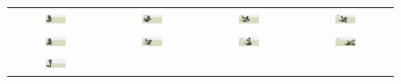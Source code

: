 \begin{figure}[ht]
\center
\setlength{\tabcolsep}{1pt}
\renewcommand{\arraystretch}{0.5}
\begin{tabular}{c c c c}
\includegraphics[width=0.24\textwidth]{images/GP_A_0.png}&
\includegraphics[width=0.24\textwidth]{images/GP_A_1.png}&
\includegraphics[width=0.24\textwidth]{images/GP_A_2.png}&
\includegraphics[width=0.24\textwidth]{images/GP_A_3.png} \\
\includegraphics[width=0.24\textwidth]{images/GP_B_0.png}&
\includegraphics[width=0.24\textwidth]{images/GP_B_1.png}&
\includegraphics[width=0.24\textwidth]{images/GP_B_2.png}&
\includegraphics[width=0.24\textwidth]{images/GP_B_3.png} \\
\includegraphics[width=0.24\textwidth]{images/Atlas_A_0.png}&

\end{tabular}
\end{figure}
